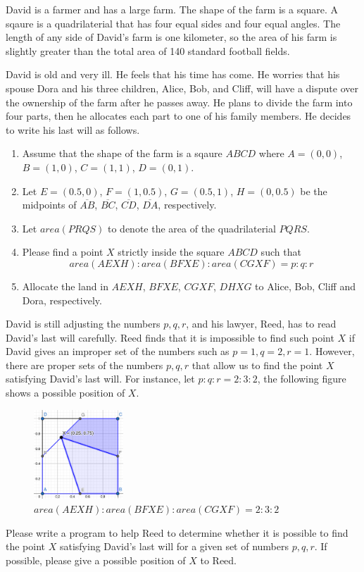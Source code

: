 David is a farmer and has a large farm. The shape of the farm is a square.
A sqaure is a quadrilaterial that has four equal sides and four equal angles.
The length of any side of David's farm is one kilometer, so the area of his farm
is slightly greater than the total area of 140 standard football fields.

David is old and very ill. He feels that his time has come.
He worries that his spouse Dora and his three children, Alice, Bob, and Cliff, 
will have a dispute over the ownership
of the farm after he passes away.
He plans to divide the farm into four parts, 
then he allocates each part to one of his family members.
He decides to write his last will as follows.
\begin{enumerate}
\tightlist
\item Assume that the shape of the farm is a sqaure $ABCD$ where $A=(0,0)$, $B=(1,0)$, 
$C=(1,1)$, $D=(0,1)$. 
\item Let $E=(0.5,0)$, $F=(1,0.5)$, $G=(0.5,1)$, $H=(0,0.5)$ be the midpoints of 
$\overline{AB}$, $\overline{BC}$, $\overline{CD}$, $\overline{DA}$, respectively.
\item Let $area(PRQS)$ to denote the area of the quadrilaterial $PQRS$.
\item Please find a point $X$ strictly inside the square $ABCD$ such that 
$$area(AEXH):area(BFXE):area(CGXF) = p:q:r$$
\item Allocate the land in $AEXH$, $BFXE$, $CGXF$, $DHXG$ to Alice, Bob, Cliff and Dora,
respectively.
\end{enumerate}

David is still adjusting the numbers $p,q,r$, and his lawyer, Reed, has to read David's
last will carefully. Reed finds that it is impossible to find such point $X$ if 
David gives an improper set of the numbers such as $p=1, q=2, r=1$. 
However, there are proper sets of the numbers $p,q,r$ that allow us to find the point $X$
satisfying David's last will.
For instance, let $p:q:r = 2:3:2$, the following figure shows a possible position of $X$.

\begin{figure}[h]
\center
\includegraphics[width=0.3\textwidth]{image/farm.png}
\caption{$area(AEXH):area(BFXE):area(CGXF) = 2:3:2$}
\end{figure}

Please write a program to help Reed to determine whether it is possible to find the point
$X$ satisfying David's last will for a given set of numbers $p,q,r$.
If possible, please give a possible position of $X$ to Reed.
